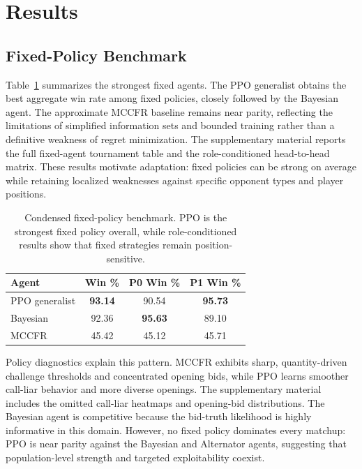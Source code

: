 \documentclass{article}
\begin{document}
\section{Results}
\subsection{Fixed-Policy Benchmark}
Table~\ref{tab:fixed_benchmark} summarizes the strongest fixed agents.
The PPO generalist obtains the best aggregate win rate among fixed policies, closely followed by the Bayesian agent. The approximate MCCFR baseline remains near parity, reflecting the limitations of simplified information sets and bounded training rather than a definitive weakness of regret minimization. The supplementary material reports the full fixed-agent tournament table and the role-conditioned head-to-head matrix. These results motivate adaptation: fixed policies can be strong on average while retaining localized weaknesses against specific opponent types and player positions.

\begin{table}[t]
\centering
\small
\begin{tabular}{lccc}
\toprule
Agent & Win \% & P0 Win \% & P1 Win \% \\
\midrule
PPO generalist & \textbf{93.14} & 90.54 & \textbf{95.73} \\
Bayesian       & 92.36 & \textbf{95.63} & 89.10 \\
MCCFR          & 45.42 & 45.12 & 45.71 \\
\bottomrule
\end{tabular}
\caption{Condensed fixed-policy benchmark. PPO is the strongest fixed policy overall, while role-conditioned results show that fixed strategies remain position-sensitive.}
\label{tab:fixed_benchmark}
\end{table}

Policy diagnostics explain this pattern. MCCFR exhibits sharp, quantity-driven challenge thresholds and concentrated opening bids, while PPO learns smoother call-liar behavior and more diverse openings. The supplementary material includes the omitted call-liar heatmaps and opening-bid distributions. The Bayesian agent is competitive because the bid-truth likelihood is highly informative in this domain. However, no fixed policy dominates every matchup: PPO is near parity against the Bayesian and Alternator agents, suggesting that population-level strength and targeted exploitability coexist.
\end{document}

